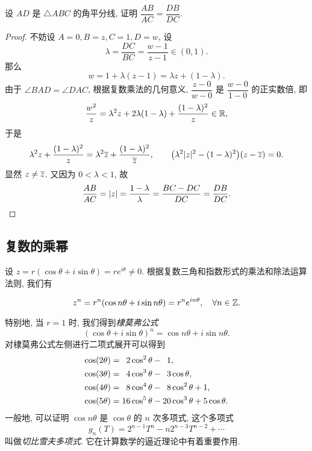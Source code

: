 \begin{example}
  设 $AD$ 是 $\triangle ABC$ 的角平分线, 证明 $\dfrac{AB}{AC}=\dfrac{DB}{DC}$.
\end{example}

\begin{center}
\end{center}

\begin{proof}
  不妨设 $A=0,B=z,C=1,D=w$, 设
  \[\lambda=\dfrac{DC}{BC}=\dfrac{w-1}{z-1}\in(0,1).\]
  那么
  \[w=1+\lambda(z-1)=\lambda z+(1-\lambda).\]
  由于 $\angle BAD=\angle DAC$, 根据复数乘法的几何意义,
  $\dfrac{z-0}{w-0}$ 是 $\dfrac{w-0}{1-0}$ 的正实数倍, 即
  \[\frac{w^2}z=\lambda^2 z+2\lambda(1-\lambda)+\frac{(1-\lambda)^2}z\in{\mathbb{R}},\]
  于是
    \[\lambda^2z+\dfrac{(1-\lambda)^2}z=\lambda^2\overline z+\dfrac{(1-\lambda)^2}{\overline z},\qquad
    \bigl(\lambda^2|z|^2-(1-\lambda)^2\bigr)(z-\overline z)=0.\]
  显然 $z\neq \overline z$. 又因为 $0<\lambda<1$, 故
    \[\frac{AB}{AC}=|z|=\frac{1-\lambda}{\lambda}
    =\frac{BC-DC}{DC}=\frac{DB}{DC}.\qedhere\]
\end{proof}


\subsection{复数的乘幂}

设 $z=r(\cos\theta+i\sin\theta)=re^{i\theta}\neq0$.
根据复数三角和指数形式的乘法和除法运算法则, 我们有
\begin{theorem}[复数的乘幂]
  \[z^n=r^n(\cos{n\theta}+i\sin{n\theta})=r^ne^{in\theta},\quad\forall n\in{\mathbb{Z}}.\]
\end{theorem}
特别地, 当 $r=1$ 时, 我们得到\emph{棣莫弗公式}
\[(\cos\theta+i\sin\theta)^n=\cos{n\theta}+i\sin{n\theta}.\]
对棣莫弗公式左侧进行二项式展开可以得到
\begin{align*}
  \cos(2\theta)&=\hphantom{1}2\cos^2\theta-\hphantom{1}1,\\
  \cos(3\theta)&=\hphantom{1}4\cos^3\theta-\hphantom{1}3\cos\theta,\\
  \cos(4\theta)&=\hphantom{1}8\cos^4\theta-\hphantom{1}8\cos^2\theta+1,\\
  \cos(5\theta)&=16\cos^5\theta-20\cos^3\theta+5\cos\theta.
\end{align*}
一般地, 可以证明 $\cos{n\theta}$ 是 $\cos\theta$ 的 $n$ 次多项式,
这个多项式
\[g_n(T)=2^{n-1}T^n-n2^{n-3}T^{n-2}+\cdots\]
叫做\emph{切比雪夫多项式}.
它在计算数学的逼近理论中有着重要作用.

